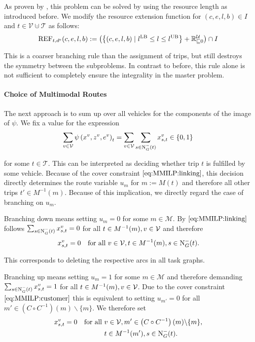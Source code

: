 As proven by \cite{Kaiser}, this problem can be solved by using the resource length as introduced before. We modify the resource extension function for $(c,e,l,b)\in I$ and ${t\in\mathcal{V}\cupdot\mathcal{T}}$ as follows:
\begin{align*}
	\operatorname{REF}_{t,d^{\operatorname{e}}}(c,e,l,b) := \left(\left\{(c,e,l,b)\mid l^{\operatorname{LB}}\leq l \leq l^{\operatorname{UB}}\right\} + \mathbb{R}^{\mathcal{U}}_{\sqsubseteq 0}\right) \cap I
\end{align*}

This is a coarser branching rule than the assignment of trips, but still destroys the symmetry between the subproblems. In contrast to before, this rule alone is not sufficient to completely ensure the integrality in the master problem.

\paragraph{Choice of Multimodal Routes} \parfill

The next approach is to sum up over all vehicles for the components of the image of $\psi$. We fix a value for the expression
\begin{align*}
	\sum_{v\in\mathcal{V}}\psi\left(x^v,z^v,e^v\right)_t = \sum_{v\in\mathcal{V}} \sum_{s\in\operatorname{N}_G^-(t)} x^v_{s,t} \in\left\{0,1\right\}
\end{align*}

for some $t\in\mathcal{T}$. This can be interpreted as deciding whether trip $t$ is fulfilled by some vehicle. Because of the cover constraint $\eqref{eq:MMILP:linking}$, this decision directly determines the route variable $u_m$ for ${m := M(t)}$ and therefore all other trips ${t'\in M^{-1}(m)}$. Because of this implication, we directly regard the case of branching on $u_m$.

Branching down means setting ${u_m = 0}$ for some ${m\in\mathcal{M}}$. By $\eqref{eq:MMILP:linking}$ follows\linebreak
${\sum_{s\in\operatorname{N}_G^-(t)}x_{s,t}^v = 0}$ for all ${t\in M^{-1}(m)}, v\in\mathcal{V}$ and therefore
\begin{align*}
	x^v_{s,t} = 0 && \text{for all } v\in\mathcal{V}, t\in M^{-1}(m), s\in\operatorname{N}_G^-(t).
\end{align*}

This corresponds to deleting the respective arcs in all task graphs.

Branching up means setting ${u_m = 1}$ for some ${m\in\mathcal{M}}$ and therefore demanding\linebreak
${\sum_{s\in\operatorname{N}_G^-(t)}x_{s,t}^v = 1}$ for all ${t\in M^{-1}(m)}, v\in\mathcal{V}$. Due to the cover constraint $\eqref{eq:MMILP:customer}$ this is equivalent to setting ${u_{m'} = 0}$ for all ${m'\in\left(C\circ C^{-1}\right)(m)\backslash\{m\}}$. We therefore set
\begin{align*}
	x^v_{s,t} = 0 && \text{for all } & v\in\mathcal{V}, m'\in\left(C\circ C^{-1}\right)(m)\backslash\{m\}, \\
	&&& t\in M^{-1}(m'), s\in\operatorname{N}_G^-(t).
\end{align*}

